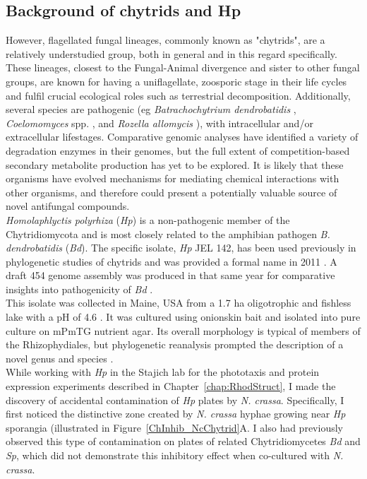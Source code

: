 \subsection{Background of chytrids and Hp}
However, flagellated fungal lineages, commonly known as "chytrids", are a relatively understudied group, both in general and in this regard specifically. These lineages, closest to the Fungal-Animal divergence and sister to other fungal groups, are known for having a uniflagellate, zoosporic stage in their life cycles and fulfil crucial ecological roles such as terrestrial decomposition. Additionally, several species are pathogenic (eg \textit{Batrachochytrium dendrobatidis} \cite{Longcore1999}, \textit{Coelomomyces} spp. \cite{Couch1972}, and \textit{Rozella allomycis} \cite{James2013}), with intracellular and/or extracellular lifestages. Comparative genomic analyses have identified a variety of degradation enzymes in their genomes, but the full extent of competition-based secondary metabolite production has yet to be explored. It is likely that these organisms have evolved mechanisms for mediating chemical interactions with other organisms, and therefore could present a potentially valuable source of novel antifungal compounds.\\
\indent \textit{Homolaphlyctis polyrhiza} (\textit{Hp}) is a non-pathogenic member of the Chytridiomycota and is most closely related to the amphibian pathogen \textit{B. dendrobatidis} (\textit{Bd}). The specific isolate, \textit{Hp} JEL 142, has been used previously in phylogenetic studies of chytrids \cite{James2000,James2006,Letcher2008} and was provided a formal name in 2011 \cite{Longcore2011}. A draft 454 genome assembly was produced in that same year for comparative insights into pathogenicity of \textit{Bd} \cite{Joneson2011}.\\
\indent This isolate was collected in Maine, USA from a 1.7 ha oligotrophic and fishless lake with a pH of 4.6 \cite{Davis1994,Rhodes1995}. It was cultured using onionskin bait and isolated into pure culture on mPmTG nutrient agar. Its overall morphology is typical of members of the Rhizophydiales, but phylogenetic reanalysis prompted the description of a novel genus and species \cite{Longcore2011}.\\
\indent While working with \textit{Hp} in the Stajich lab for the phototaxis and protein expression experiments described in Chapter~\ref{chap:RhodStruct}, I made the discovery of accidental contamination of \textit{Hp} plates by \textit{N. crassa}. Specifically, I first noticed the distinctive zone created by \textit{N. crassa} hyphae growing near \textit{Hp} sporangia (illustrated in Figure~\ref{ChInhib_NcChytrid}A. I also had previously observed this type of contamination on plates of related Chytridiomycetes \textit{Bd} and \textit{Sp}, which did not demonstrate this inhibitory effect when co-cultured with \textit{N. crassa}.\\
